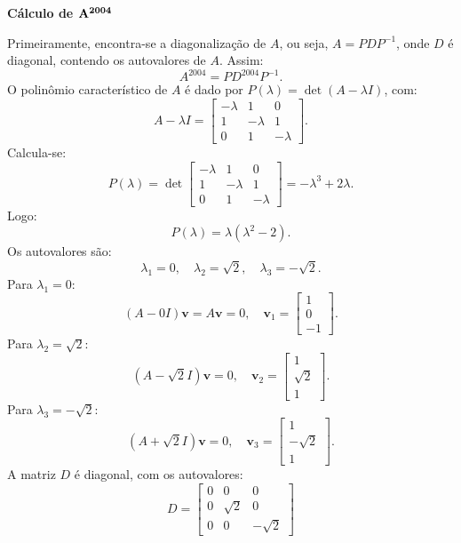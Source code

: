 \begin{resolution}
  {\bf Cálculo de \( \bf A^{2004} \)}

  Primeiramente, encontra-se a diagonalização de \( A \), ou seja, \( A = PDP^{-1} \), onde \( D \) é diagonal, contendo os autovalores de \( A \). Assim:
  \[
    A^{2004} = P D^{2004} P^{-1}.
  \]
  O polinômio característico de \( A \) é dado por \( P(\lambda) = \det(A - \lambda I) \), com:
  \[
    A - \lambda I = \begin{bmatrix}
      -\lambda & 1        & 0        \\
      1        & -\lambda & 1        \\
      0        & 1        & -\lambda
    \end{bmatrix}.
  \]
  Calcula-se:
  \[
    P(\lambda) = \det\begin{bmatrix}
      -\lambda & 1        & 0        \\
      1        & -\lambda & 1        \\
      0        & 1        & -\lambda
    \end{bmatrix} = -\lambda^3+2\lambda.
  \]
  Logo:
  \[
    P(\lambda) = \lambda(\lambda^2 - 2).
  \]
  Os autovalores são:
  \[
    \lambda_1 = 0, \quad \lambda_2 = \sqrt{2}, \quad \lambda_3 = -\sqrt{2}.
  \]
  Para \( \lambda_1 = 0 \):
  \[
    (A - 0I)\mathbf{v} = A\mathbf{v} = 0, \quad \mathbf{v}_1 = \begin{bmatrix} 1 \\ 0 \\ -1 \end{bmatrix}.
  \]
  Para \( \lambda_2 = \sqrt{2} \):
  \[
    (A - \sqrt{2}I)\mathbf{v} = 0, \quad \mathbf{v}_2 = \begin{bmatrix} 1 \\ \sqrt{2} \\ 1 \end{bmatrix}.
  \]
  Para \( \lambda_3 = -\sqrt{2} \):
  \[
    (A + \sqrt{2}I)\mathbf{v} = 0, \quad \mathbf{v}_3 = \begin{bmatrix} 1 \\ -\sqrt{2} \\ 1 \end{bmatrix}.
  \]
  A matriz \( D \) é diagonal, com os autovalores:
  \[
    D = \begin{bmatrix}
      0 & 0        & 0         \\
      0 & \sqrt{2} & 0         \\
      0 & 0        & -\sqrt{2}

\end{bmatrix}\]
\end{resolution}
